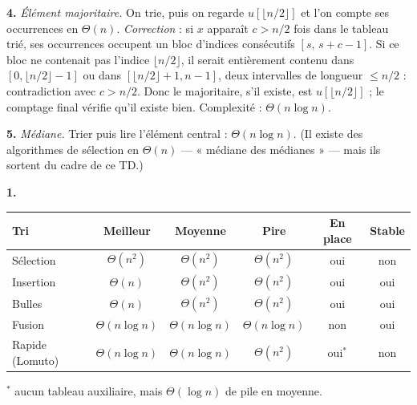 \documentclass[11pt,a4paper]{article}
\begin{document}
\textbf{4.} \emph{Élément majoritaire.} On trie, puis on regarde $u[\lfloor n/2\rfloor]$
et l'on compte ses occurrences en $\Theta(n)$.
\emph{Correction} : si $x$ apparaît $c>n/2$ fois dans le tableau trié, ses occurrences
occupent un bloc d'indices consécutifs $[s,\,s+c-1]$. Si ce bloc ne contenait pas
l'indice $\lfloor n/2\rfloor$, il serait entièrement contenu dans
$[0,\lfloor n/2\rfloor-1]$ ou dans $[\lfloor n/2\rfloor+1,n-1]$, deux intervalles de
longueur $\le n/2$ : contradiction avec $c>n/2$. Donc le majoritaire, s'il existe, est
$u[\lfloor n/2\rfloor]$ ; le comptage final vérifie qu'il existe bien.
Complexité : $\Theta(n\log n)$.

\textbf{5.} \emph{Médiane.} Trier puis lire l'élément central : $\Theta(n\log n)$.
(Il existe des algorithmes de sélection en $\Theta(n)$ --- « médiane des médianes » ---
mais ils sortent du cadre de ce TD.)

\reponse
\textbf{1.}
\begin{center}\small
\begin{tabular}{|l|c|c|c|c|c|}
\hline
\textbf{Tri} & \textbf{Meilleur} & \textbf{Moyenne} & \textbf{Pire} &
\textbf{En place} & \textbf{Stable} \\\hline
Sélection & $\Theta(n^2)$ & $\Theta(n^2)$ & $\Theta(n^2)$ & oui & non \\\hline
Insertion & $\Theta(n)$ & $\Theta(n^2)$ & $\Theta(n^2)$ & oui & oui \\\hline
Bulles & $\Theta(n)$ & $\Theta(n^2)$ & $\Theta(n^2)$ & oui & oui \\\hline
Fusion & $\Theta(n\log n)$ & $\Theta(n\log n)$ & $\Theta(n\log n)$ & non & oui \\\hline
Rapide (Lomuto) & $\Theta(n\log n)$ & $\Theta(n\log n)$ & $\Theta(n^2)$ &
oui$^{*}$ & non \\\hline
\end{tabular}
\end{center}
{\footnotesize $^{*}$ aucun tableau auxiliaire, mais $\Theta(\log n)$ de pile en moyenne.}
\end{document}
